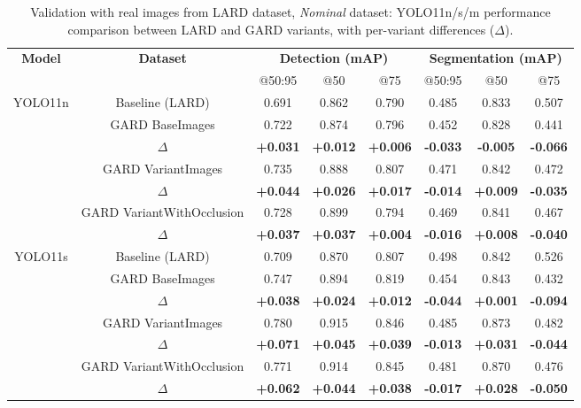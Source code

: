 \medskip

\begin{table}[htbp]
\centering
\small
\setlength{\tabcolsep}{4pt}
\renewcommand{\arraystretch}{1.2}

  \caption{Validation with real images from LARD dataset, \emph{Nominal} dataset: YOLO11n/s/m performance comparison between LARD and GARD variants, with per-variant differences ($\Delta$).}
  \label{tab:nominal_results}

\begin{tabular}{|c|c|ccc|ccc|}
\hline
\multirow{2}{*}{\textbf{Model}} &
\multirow{2}{*}{\textbf{Dataset}} &
\multicolumn{3}{c|}{\textbf{Detection (mAP)}} &
\multicolumn{3}{c|}{\textbf{Segmentation (mAP)}} \\
& & @50:95 & @50 & @75 & @50:95 & @50 & @75 \\

\hline
\multirow{6}{*}{YOLO11n}
& Baseline (LARD) & 0.691 & 0.862 & 0.790 & 0.485 & 0.833 & 0.507 \\
& GARD BaseImages & 0.722 & 0.874 & 0.796 & 0.452 & 0.828 & 0.441 \\
& $\Delta$ & \textbf{+0.031} & \textbf{+0.012} & \textbf{+0.006} & \textbf{-0.033} & \textbf{-0.005} & \textbf{-0.066} \\
& GARD VariantImages & 0.735 & 0.888 & 0.807 & 0.471 & 0.842 & 0.472 \\
& $\Delta$ & \textbf{+0.044} & \textbf{+0.026} & \textbf{+0.017} & \textbf{-0.014} & \textbf{+0.009} & \textbf{-0.035} \\
& GARD VariantWithOcclusion & 0.728 & 0.899 & 0.794 & 0.469 & 0.841 & 0.467 \\
& $\Delta$ & \textbf{+0.037} & \textbf{+0.037} & \textbf{+0.004} & \textbf{-0.016} & \textbf{+0.008} & \textbf{-0.040} \\
\hline

\hline
\multirow{6}{*}{YOLO11s}
& Baseline (LARD) & 0.709 & 0.870 & 0.807 & 0.498 & 0.842 & 0.526 \\
& GARD BaseImages & 0.747 & 0.894 & 0.819 & 0.454 & 0.843 & 0.432 \\
& $\Delta$ & \textbf{+0.038} & \textbf{+0.024} & \textbf{+0.012} & \textbf{-0.044} & \textbf{+0.001} & \textbf{-0.094} \\
& GARD VariantImages & 0.780 & 0.915 & 0.846 & 0.485 & 0.873 & 0.482 \\
& $\Delta$ & \textbf{+0.071} & \textbf{+0.045} & \textbf{+0.039} & \textbf{-0.013} & \textbf{+0.031} & \textbf{-0.044} \\
& GARD VariantWithOcclusion & 0.771 & 0.914 & 0.845 & 0.481 & 0.870 & 0.476 \\
& $\Delta$ & \textbf{+0.062} & \textbf{+0.044} & \textbf{+0.038} & \textbf{-0.017} & \textbf{+0.028} & \textbf{-0.050} \\
\hline



\end{tabular}
\end{table}
